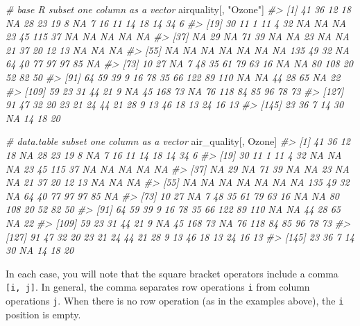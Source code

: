 \documentclass[
]{book}
\newenvironment{Shaded}{\begin{snugshade}}{\end{snugshade}}
\newcommand{\CommentTok}[1]{\textcolor[rgb]{0.56,0.35,0.01}{\textit{#1}}}
\newcommand{\NormalTok}[1]{#1}
\newcommand{\StringTok}[1]{\textcolor[rgb]{0.31,0.60,0.02}{#1}}
\begin{document}
\begin{Shaded}
\begin{Highlighting}[]
\CommentTok{\# base R subset one column as a vector}
\NormalTok{airquality[, }\StringTok{"Ozone"}\NormalTok{]}
\CommentTok{\#\textgreater{}   [1]  41  36  12  18  NA  28  23  19   8  NA   7  16  11  14  18  14  34   6}
\CommentTok{\#\textgreater{}  [19]  30  11   1  11   4  32  NA  NA  NA  23  45 115  37  NA  NA  NA  NA  NA}
\CommentTok{\#\textgreater{}  [37]  NA  29  NA  71  39  NA  NA  23  NA  NA  21  37  20  12  13  NA  NA  NA}
\CommentTok{\#\textgreater{}  [55]  NA  NA  NA  NA  NA  NA  NA 135  49  32  NA  64  40  77  97  97  85  NA}
\CommentTok{\#\textgreater{}  [73]  10  27  NA   7  48  35  61  79  63  16  NA  NA  80 108  20  52  82  50}
\CommentTok{\#\textgreater{}  [91]  64  59  39   9  16  78  35  66 122  89 110  NA  NA  44  28  65  NA  22}
\CommentTok{\#\textgreater{} [109]  59  23  31  44  21   9  NA  45 168  73  NA  76 118  84  85  96  78  73}
\CommentTok{\#\textgreater{} [127]  91  47  32  20  23  21  24  44  21  28   9  13  46  18  13  24  16  13}
\CommentTok{\#\textgreater{} [145]  23  36   7  14  30  NA  14  18  20}

\CommentTok{\# data.table subset one column as a vector}
\NormalTok{air\_quality[, Ozone]}
\CommentTok{\#\textgreater{}   [1]  41  36  12  18  NA  28  23  19   8  NA   7  16  11  14  18  14  34   6}
\CommentTok{\#\textgreater{}  [19]  30  11   1  11   4  32  NA  NA  NA  23  45 115  37  NA  NA  NA  NA  NA}
\CommentTok{\#\textgreater{}  [37]  NA  29  NA  71  39  NA  NA  23  NA  NA  21  37  20  12  13  NA  NA  NA}
\CommentTok{\#\textgreater{}  [55]  NA  NA  NA  NA  NA  NA  NA 135  49  32  NA  64  40  77  97  97  85  NA}
\CommentTok{\#\textgreater{}  [73]  10  27  NA   7  48  35  61  79  63  16  NA  NA  80 108  20  52  82  50}
\CommentTok{\#\textgreater{}  [91]  64  59  39   9  16  78  35  66 122  89 110  NA  NA  44  28  65  NA  22}
\CommentTok{\#\textgreater{} [109]  59  23  31  44  21   9  NA  45 168  73  NA  76 118  84  85  96  78  73}
\CommentTok{\#\textgreater{} [127]  91  47  32  20  23  21  24  44  21  28   9  13  46  18  13  24  16  13}
\CommentTok{\#\textgreater{} [145]  23  36   7  14  30  NA  14  18  20}
\end{Highlighting}
\end{Shaded}

In each case, you will note that the square bracket operators include a comma \texttt{{[}i,\ j{]}}. In general, the comma separates row operations \texttt{i} from column operations \texttt{j}. When there is no row operation (as in the examples above), the \texttt{i} position is empty.
\end{document}
